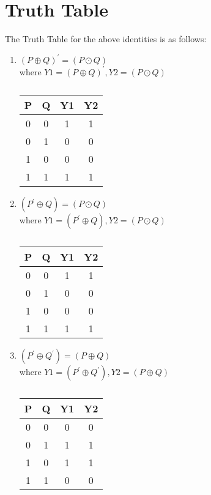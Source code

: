 \documentclass[a4paper,11pt,twocolumn]{article}
\begin{document}
\section{Truth Table}
The Truth Table for the above identities is as follows:
\begin{enumerate}[label=\textbf{(\Alph*})]
	\item \textbf{$ (P\oplus Q)^{\prime} = (P\odot Q)$} \\
where $Y1=(P\oplus Q)^{\prime}, Y2=(P\odot Q)$\\
\bigskip
\begin{table}[ht!]
	\centering
\begin{tabular}{ |c |c |c |c |} 
\hline 
\newline 
	\textbf{P} & \textbf{Q} & \textbf{Y1} & \textbf{Y2} \\ 
\hline
	0 & 0 &1 &1\\   
	0 & 1 &0 &0\\  
	1 & 0 &0 &0\\  
	1 & 1 &1 &1\\  
\hline 
\end{tabular}
	\caption{}
\end{table}
\bigskip
\bigskip

	\item \textbf{$(P^{\prime}\oplus Q)=(P\odot Q)$}\\
where $Y1=(P^{\prime}\oplus Q), Y2=(P\odot Q)$\\
\bigskip
\begin{table}[ht!]
	\centering
\begin{tabular}{ |c |c |c |c |} 
\hline 
\newline 
	\textbf{P} & \textbf{Q} & \textbf{Y1} & \textbf{Y2}\\
\hline  
	0 & 0 &1 &1\\   
	0 & 1 &0 &0\\ 
	1 & 0 &0 &0\\  
	1 & 1 &1 &1\\
\hline 
\end{tabular}
\caption{}
\end{table}
\bigskip


\item \textbf{$(P^{\prime}\oplus Q^{\prime}) = (P\oplus Q)$} \\ where $Y1=(P^{\prime}\oplus Q^{\prime}), Y2=(P\oplus Q)$\\
\bigskip
\begin{table}[h]
	\centering
\begin{tabular}{ |c |c |c |c |} 
\hline 
\newline 
\textbf{P} & \textbf{Q} & \textbf{Y1} & \textbf{Y2}\\ 
\hline 
	0 & 0 &0 &0\\   
	0 & 1 &1 &1\\  
	1 & 0 &1 &1\\
	1 & 1 &0 &0\\
 \hline 
 \end{tabular}
	\caption{}
\end{table}


\end{enumerate}
\end{document}
